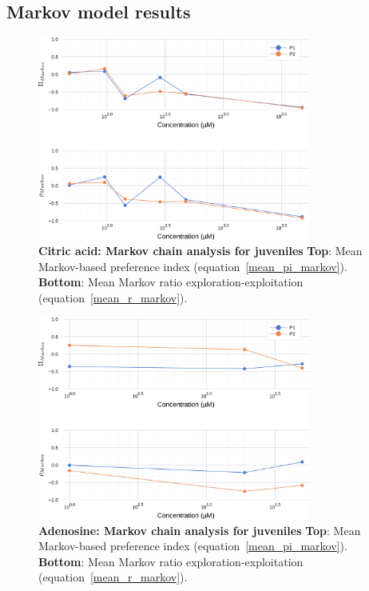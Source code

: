 \begin{appendices}
  \chapter{Markov model results}
    \begin{figure}[h]
      \centering
      \includegraphics[width=0.8\textwidth]{part_2/assets/citricacid_markov.png}
      \caption{\textbf{Citric acid: Markov chain analysis for juveniles} \textbf{Top}: Mean Markov-based preference index (equation~\ref{mean_pi_markov}). \textbf{Bottom}: Mean Markov ratio exploration-exploitation (equation~\ref{mean_r_markov}).}
      \label{citric_acid_markov}
    \end{figure}
    \begin{figure}[h]
      \centering
      \includegraphics[width=0.8\textwidth]{part_2/assets/adenosine_markov.png}
      \caption{\textbf{Adenosine: Markov chain analysis for juveniles} \textbf{Top}: Mean Markov-based preference index (equation~\ref{mean_pi_markov}). \textbf{Bottom}: Mean Markov ratio exploration-exploitation (equation~\ref{mean_r_markov}).}

\end{figure}
\end{appendices}
